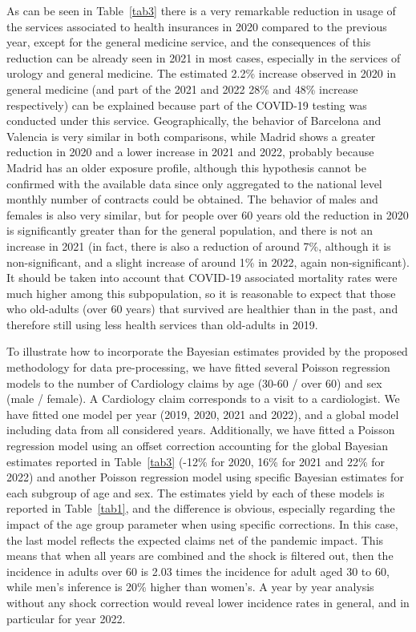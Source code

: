 \documentclass[]{risa}
\begin{document}
As can be seen in Table~\ref{tab3} there is a very remarkable reduction in usage of the services associated to health insurances in 2020 compared to the previous year, except for the general medicine service, and the consequences of this reduction can be already seen in 2021 in most cases, especially in the services of urology and general medicine. The estimated 2.2\% increase observed in 2020 in general medicine (and part of the 2021 and 2022 28\% and 48\% increase respectively) can be explained because part of the COVID-19 testing was conducted under this service. Geographically, the behavior of Barcelona and Valencia is very similar in both comparisons, while Madrid shows a greater reduction in 2020 and a lower increase in 2021 and 2022, probably because Madrid has an older exposure profile, although this hypothesis cannot be confirmed with the available data since only aggregated to the national level monthly number of contracts could be obtained. The behavior of males and females is also very similar, but for people over 60 years old the reduction in 2020 is significantly greater than for the general population, and there is not an increase in 2021 (in fact, there is also a reduction of around 7\%, although it is non-significant, and a slight increase of around 1\% in 2022, again non-significant). It should be taken into account that COVID-19 associated mortality rates were much higher among this subpopulation, so it is reasonable to expect that those who old-adults (over 60 years) that survived are healthier than in the past, and therefore still using less health services than old-adults in 2019.


To illustrate how to incorporate the Bayesian estimates provided by the proposed methodology for data pre-processing, we have fitted several Poisson regression models to the number of Cardiology claims by age (30-60 / over 60) and sex (male / female). A Cardiology claim corresponds to a visit to a cardiologist. We have fitted one model per year (2019, 2020, 2021 and 2022), and a global model including data from all considered years. Additionally, we have fitted a Poisson regression model using an offset correction accounting for the global Bayesian estimates reported in Table~\ref{tab3} (-12\% for 2020, 16\% for 2021 and 22\% for 2022) and another Poisson regression model using specific Bayesian estimates for each subgroup of age and sex. The estimates yield by each of these models is reported in Table~\ref{tab1}, and the difference is obvious, especially regarding the impact of the age group parameter when using specific corrections. In this case, the last model reflects the expected claims net of the pandemic impact. This means that when all years are combined and the shock is filtered out, then the incidence in adults over 60 is 2.03 times the incidence for adult aged 30 to 60, while men's inference is 20\% higher  than women's. A year by year analysis without any shock correction would reveal lower incidence rates in general, and in particular for year 2022.
\end{document}
